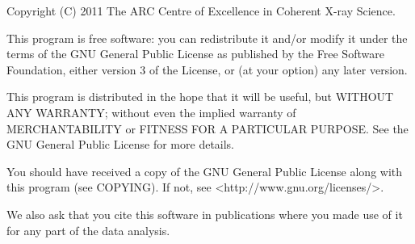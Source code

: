 \documentclass[]{nadia}
\begin{document}
Copyright (C) 2011 The ARC Centre of Excellence in Coherent X-ray
Science.

This program is free software: you can redistribute it and/or modify
it under the terms of the GNU General Public License as published
by the Free Software Foundation, either version 3 of the License,
or (at your option) any later version.

This program is distributed in the hope that it will be useful,
but WITHOUT ANY WARRANTY; without even the implied warranty of
MERCHANTABILITY or FITNESS FOR A PARTICULAR PURPOSE.  See the
GNU General Public License for more details.

You should have received a copy of the GNU General Public License
along with this program (see COPYING).  If not, see
<http://www.gnu.org/licenses/>.

We also ask that you cite this software in publications where you made
use of it for any part of the data analysis.
\end{document}
